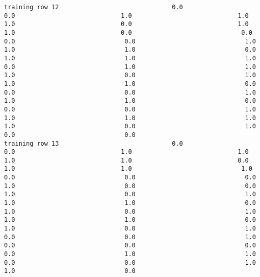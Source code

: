 \documentclass[11pt]{article}
\begin{document}
\begin{verbatim}
training row 12                               0.0                             0.0                             1.0                             1.0                             1.0                             0.0                             1.0                             1.0                             0.0                              0.0                              0.0                              0.0                              1.0                              1.0                              1.0                              0.0                              1.0                              1.0                              1.0                              0.0                              1.0                              1.0                              1.0                              0.0                              1.0                              1.0                              1.0                              0.0                              0.0                              0.0                              1.0                              1.0                              1.0                              0.0                              0.0                              0.0                              1.0                              1.0                              1.0                              1.0                              1.0                              0.0                              1.0                              0.0                              0.0
training row 13                               0.0                             0.0                             1.0                             1.0                             1.0                             1.0                             0.0                             1.0                             1.0                              1.0                              0.0                              0.0                              0.0                              1.0                              0.0                              0.0                              1.0                              0.0                              1.0                              1.0                              1.0                              0.0                              1.0                              0.0                              1.0                              1.0                              1.0                              0.0                              1.0                              0.0                              1.0                              0.0                              0.0                              1.0                              0.0                              0.0                              0.0                              0.0                              1.0                              1.0                              0.0                              0.0                              1.0                              1.0                              0.0

\end{verbatim}
\end{document}

